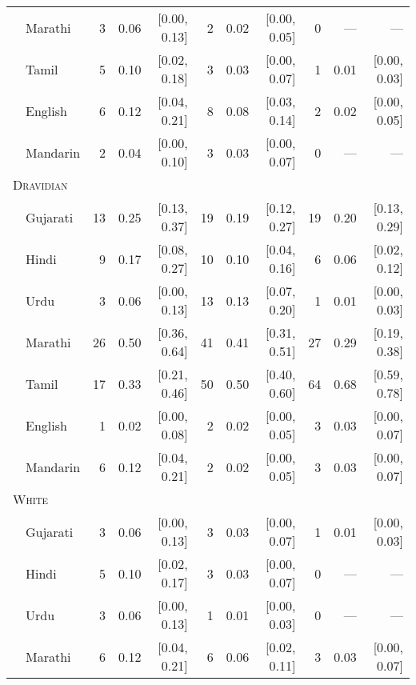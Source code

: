 \begin{table}[H]
\begin{footnotesize}
\begin{tabular}{p{.1in}lrrrrrrrrr}
 & Marathi & 3 & 0.06 & [0.00, 0.13] & 2 & 0.02 & [0.00, 0.05] & 0 & --- & ---\\

 & Tamil & 5 & 0.10 & [0.02, 0.18] & 3 & 0.03 & [0.00, 0.07] & 1 & 0.01 & [0.00, 0.03]\\

 & English & 6 & 0.12 & [0.04, 0.21] & 8 & 0.08 & [0.03, 0.14] & 2 & 0.02 & [0.00, 0.05]\\

& Mandarin & 2 & 0.04 & [0.00, 0.10] & 3 & 0.03 & [0.00, 0.07] & 0 & --- & ---\\
\midrule
\multicolumn{11}{l}{\textsc{Dravidian}}\\
& Gujarati & 13 & 0.25 & [0.13, 0.37] & 19 & 0.19 & [0.12, 0.27] & 19 & 0.20 & [0.13, 0.29]\\

 & Hindi & 9 & 0.17 & [0.08, 0.27] & 10 & 0.10 & [0.04, 0.16] & 6 & 0.06 & [0.02, 0.12]\\

 & Urdu & 3 & 0.06 & [0.00, 0.13] & 13 & 0.13 & [0.07, 0.20] & 1 & 0.01 & [0.00, 0.03]\\

 & Marathi & 26 & 0.50 & [0.36, 0.64] & 41 & 0.41 & [0.31, 0.51] & 27 & 0.29 & [0.19, 0.38]\\

 & Tamil & 17 & 0.33 & [0.21, 0.46] & 50 & 0.50 & [0.40, 0.60] & 64 & 0.68 & [0.59, 0.78]\\

 & English & 1 & 0.02 & [0.00, 0.08] & 2 & 0.02 & [0.00, 0.05] & 3 & 0.03 & [0.00, 0.07]\\

 & Mandarin & 6 & 0.12 & [0.04, 0.21] & 2 & 0.02 & [0.00, 0.05] & 3 & 0.03 & [0.00, 0.07]\\

\midrule
\multicolumn{11}{l}{\textsc{White}}\\
  & Gujarati & 3 & 0.06 & [0.00, 0.13] & 3 & 0.03 & [0.00, 0.07] & 1 & 0.01 & [0.00, 0.03]\\

 & Hindi & 5 & 0.10 & [0.02, 0.17] & 3 & 0.03 & [0.00, 0.07] & 0 & --- & ---\\

 & Urdu & 3 & 0.06 & [0.00, 0.13] & 1 & 0.01 & [0.00, 0.03] & 0 & --- & ---\\

 & Marathi & 6 & 0.12 & [0.04, 0.21] & 6 & 0.06 & [0.02, 0.11] & 3 & 0.03 & [0.00, 0.07]\\


\end{tabular}
\end{footnotesize}
\end{table}

